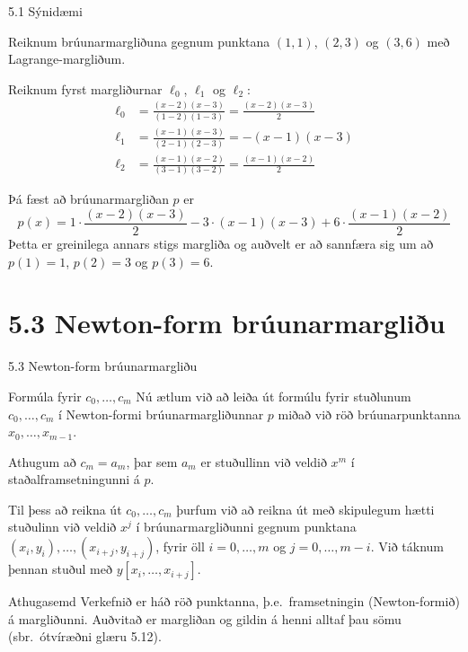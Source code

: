 \begin{frame}{5.1 Sýnidæmi} 

Reiknum brúunarmargliðuna gegnum punktana $(1,1)$,
$(2,3)$ og $(3,6)$ með Lagrange-margliðum. 

\pause
\smallskip
Reiknum fyrst
margliðurnar $\ell_{0}$, $\ell_{1}$ og $\ell_{2}$: 
\begin{align*}
  \ell_{0} &= \frac{(x-2)(x-3)}{(1-2)(1-3)} 
  = \frac{(x-2)(x-3)}{2} \\
  \ell_{1} &= \frac{(x-1)(x-3)}{(2-1)(2-3)}
  = -(x-1)(x-3) \\
  \ell_{2} &= \frac{(x-1)(x-2)}{(3-1)(3-2)}
  = \frac{(x-1)(x-2)}{2}
\end{align*}

\pause
Þá fæst að brúunarmargliðan $p$ er
\begin{equation*}
  p(x) = 1 \cdot \frac{(x-2)(x-3)}{2}
  - 3 \cdot (x-1)(x-3)
  + 6 \cdot \frac{(x-1)(x-2)}{2}
\end{equation*}
\pause
Þetta er greinilega annars stigs margliða og auðvelt er að sannfæra
sig um að $p(1) = 1$, $p(2) = 3$ og $p(3) = 6$. 
\end{frame}

\section*{5.3 Newton-form brúunarmargliðu} 
\begin{frame}{5.3 Newton-form brúunarmargliðu} 
\begin{block}{Formúla fyrir $c_0, \ldots, c_m$}
Nú ætlum við að leiða út formúlu fyrir stuðlunum $c_0, \ldots, c_m$ 
í Newton-formi brúunarmargliðunnar $p$ miðað við röð brúunarpunktanna
$x_0, \ldots, x_{m-1}$. 

\pause
\smallskip
Athugum að $c_m = a_m$, þar sem $a_m$ er
stuðullinn  við veldið $x^m$ í staðalframsetningunni á $p$.
\end{block}

\pause
\begin{block}{}
Til þess að reikna út $c_0, \ldots, c_m$ þurfum við að reikna út 
með skipulegum hætti stuðulinn við veldið $x^j$ í brúunarmargliðunni 
gegnum punktana $(x_i,y_i), \ldots, (x_{i+j},y_{i+j})$, fyrir öll
$i = 0, \ldots, m$ og $j = 0, \ldots, m-i$. Við táknum þennan
stuðul með $y[x_i, \ldots, x_{i+j}]$.
\end{block}\pause
\begin{block}{Athugasemd}
 Verkefnið er háð röð punktanna, þ.e.~framsetningin (Newton-formið) á margliðunni. 
 Auðvitað er margliðan og gildin á henni alltaf þau sömu (sbr.~ótvíræðni glæru 5.12).
\end{block}
\end{frame}

